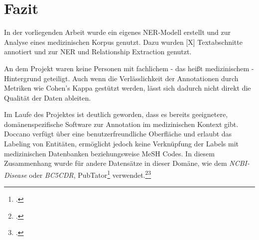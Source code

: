 \section{Fazit}\label{sec:Fazit}
In der vorliegenden Arbeit wurde ein eigenes \ac{NER}-Modell erstellt und zur Analyse eines medizinischen Korpus genutzt. Dazu wurden [X] Textabschnitte annotiert und zur \acf*{NER} und Relationship Extraction genutzt.

An dem Projekt waren keine Personen mit fachlichem - das heißt medizinischem - Hintergrund geteiligt. Auch wenn die Verlässlichkeit der Annotationen durch Metriken wie Cohen's Kappa gestützt werden, lässt sich dadurch nicht direkt die Qualität der Daten ableiten.

Im Laufe des Projektes ist deutlich geworden, dass es bereits geeignetere, domänenspezifische Software zur Annotation im medizinischen Kontext gibt. Doccano verfügt über eine benutzerfreundliche Oberfläche und erlaubt das Labeling von Entitäten, ermöglicht jedoch keine Verknüpfung der Labels mit medizinischen Datenbanken beziehungsweise \ac{MeSH} Codes. In diesem Zusammenhang wurde für andere Datensätze in dieser Domäne, wie dem \textit{NCBI-Disease} oder \textit{BC5CDR}, PubTator\footcite{wei2013} verwendet.\footcite[vgl.][S.9]{dogan2014}\footcite[vgl.][S.4]{li2016}
